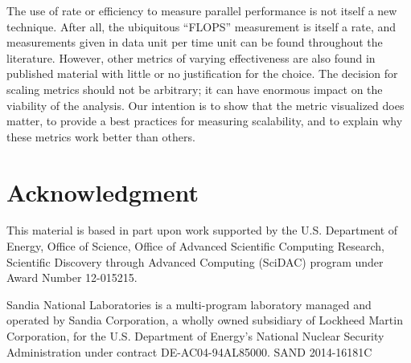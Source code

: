 \documentclass{llncs}
\newcommand*{\lcite}[1]{~\cite{#1}}
\begin{document}

The use of rate or efficiency to measure parallel performance is not itself
a new technique. After all, the ubiquitous ``FLOPS'' measurement is itself
a rate, and measurements given in data unit per time unit can be found
throughout the literature. However, other metrics of varying effectiveness
are also found in published material with little or no justification for
the choice. The decision for scaling metrics should not be arbitrary; it
can have enormous impact on the viability of the analysis. Our intention is
to show that the metric visualized does matter, to provide a best practices
for measuring scalability, and to explain why these metrics work better
than others.


\section*{Acknowledgment}

\noindent
This material is based in part upon work supported by the U.S. Department
of Energy, Office of Science, Office of Advanced Scientific Computing
Research, Scientific Discovery through Advanced Computing (SciDAC) program
under Award Number 12-015215.

Sandia National Laboratories is a multi-program laboratory managed and
operated by Sandia Corporation, a wholly owned subsidiary of Lockheed
Martin Corporation, for the U.S. Department of Energy's National Nuclear
Security Administration under contract DE-AC04-94AL85000. \hfill
{\footnotesize SAND 2014-16181C}



\end{document}
